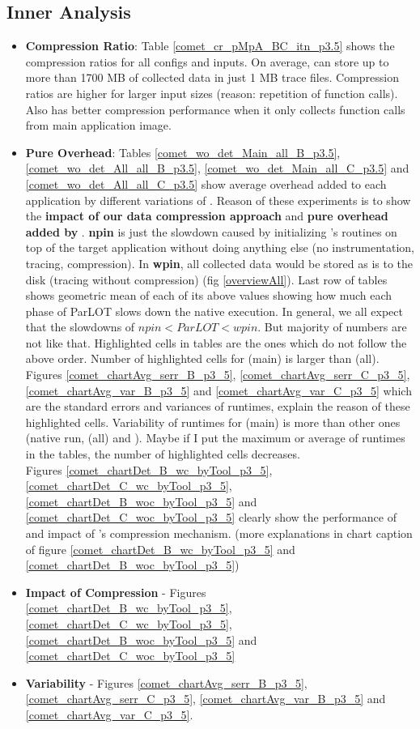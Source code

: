 \subsection{\parlot Inner Analysis}
	\begin{itemize}
	\item \textbf{Compression Ratio}: Table \ref{comet_cr_pMpA_BC_itn_p3.5} shows the compression ratios for all configs and inputs. On average, \parlot can store up to more than 1700 MB of collected data in just 1 MB trace files. Compression ratios are higher for larger input sizes (reason: repetition of function calls). Also \parlot has better compression performance when it only collects function calls from main application image.
	\item \textbf{Pure \pin Overhead}: Tables \ref{comet_wo_det_Main_all_B_p3.5}, \ref{comet_wo_det_All_all_B_p3.5}, \ref{comet_wo_det_Main_all_C_p3.5} and  \ref{comet_wo_det_All_all_C_p3.5} show average overhead added to each application by different variations of \parlot. Reason of these experiments is to show the \textbf{impact of our data compression approach} and \textbf{pure overhead added by \pin}. \textbf{npin} is just the slowdown caused by initializing \pin's routines on top of the target application without doing anything else (no instrumentation, tracing, compression). In \textbf{wpin}, all collected data would be stored as is to the disk (tracing without compression) (fig \ref{overviewAll}). Last row of tables shows geometric mean of each of its above values showing how much each phase of ParLOT slows down the native execution. In general, we all expect that the slowdowns of $npin < ParLOT < wpin $. But majority of numbers are not like that. Highlighted cells in tables are the ones which do not follow the above order. Number of highlighted cells for \parlot(main) is larger than \parlot(all). Figures \ref{comet_chartAvg_serr_B_p3_5}, \ref{comet_chartAvg_serr_C_p3_5}, \ref{comet_chartAvg_var_B_p3_5} and  \ref{comet_chartAvg_var_C_p3_5} which are the standard errors and variances of runtimes, explain the reason of these highlighted cells. Variability of runtimes for \parlot(main) is more than other ones (native run, \parlot(all) and \callgrind). Maybe if I put the maximum or average of runtimes in the tables, the number of highlighted cells decreases.\\
	Figures \ref{comet_chartDet_B_wc_byTool_p3_5}, \ref{comet_chartDet_C_wc_byTool_p3_5}, \ref{comet_chartDet_B_woc_byTool_p3_5} and \ref{comet_chartDet_C_woc_byTool_p3_5} clearly show the performance of \parlot and impact of \parlot 's compression mechanism. (more explanations in chart caption of figure \ref{comet_chartDet_B_wc_byTool_p3_5} and \ref{comet_chartDet_B_woc_byTool_p3_5})
	\item \textbf{Impact of Compression} - Figures \ref{comet_chartDet_B_wc_byTool_p3_5}, \ref{comet_chartDet_C_wc_byTool_p3_5}, \ref{comet_chartDet_B_woc_byTool_p3_5} and \ref{comet_chartDet_C_woc_byTool_p3_5}
	\item \textbf{Variability} - Figures \ref{comet_chartAvg_serr_B_p3_5}, \ref{comet_chartAvg_serr_C_p3_5}, \ref{comet_chartAvg_var_B_p3_5} and  \ref{comet_chartAvg_var_C_p3_5}.
	\end{itemize}


